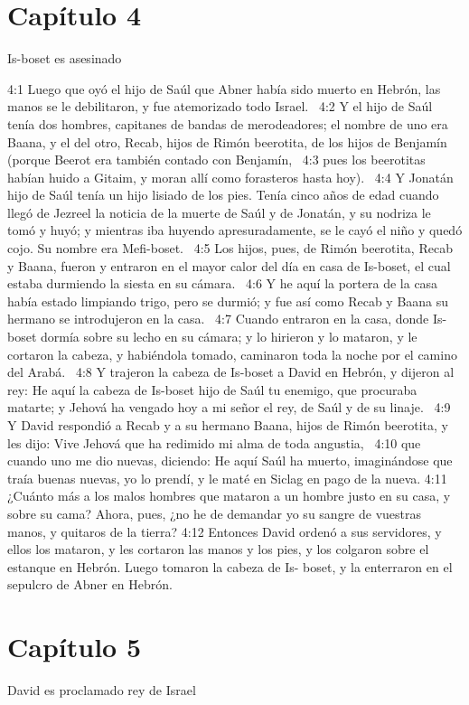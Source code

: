 \section*{Capítulo 4 }
Is-boset es asesinado  

4:1 Luego que oyó el hijo de Saúl que Abner había sido muerto en Hebrón, las manos se le debilitaron, y fue atemorizado todo Israel.  
4:2 Y el hijo de Saúl tenía dos hombres, capitanes de bandas de merodeadores; el nombre de uno era Baana, y el del otro, Recab, hijos de Rimón beerotita, de los hijos de Benjamín (porque Beerot era también contado con Benjamín,  
4:3 pues los beerotitas habían huido a Gitaim, y moran allí como forasteros hasta hoy).  
4:4 Y Jonatán hijo de Saúl tenía un hijo lisiado de los pies. Tenía cinco años de edad cuando llegó de Jezreel la noticia de la muerte de Saúl y de Jonatán, y su nodriza le tomó y huyó; y mientras iba huyendo apresuradamente, se le cayó el niño y quedó cojo. Su nombre era Mefi-boset.  
4:5 Los hijos, pues, de Rimón beerotita, Recab y Baana, fueron y entraron en el mayor calor del día en casa de Is-boset, el cual estaba durmiendo la siesta en su cámara.  
4:6 Y he aquí la portera de la casa había estado limpiando trigo, pero se durmió; y fue así como Recab y Baana su hermano se introdujeron en la casa.  
4:7 Cuando entraron en la casa, donde Is-boset dormía sobre su lecho en su cámara; y lo hirieron y lo mataron, y le cortaron la cabeza, y habiéndola tomado, caminaron toda la noche por el camino del Arabá.  
4:8 Y trajeron la cabeza de Is-boset a David en Hebrón, y dijeron al rey: He aquí la cabeza de Is-boset hijo de Saúl tu enemigo, que procuraba matarte; y Jehová ha vengado hoy a mi señor el rey, de Saúl y de su linaje.  
4:9 Y David respondió a Recab y a su hermano Baana, hijos de Rimón beerotita, y les dijo: Vive Jehová que ha redimido mi alma de toda angustia,  
4:10 que cuando uno me dio nuevas, diciendo: He aquí Saúl ha muerto, imaginándose que traía buenas nuevas, yo lo prendí, y le maté en Siclag en pago de la nueva. 
4:11 ¿Cuánto más a los malos hombres que mataron a un hombre justo en su casa, y sobre su cama? Ahora, pues, ¿no he de demandar yo su sangre de vuestras manos, y quitaros de la tierra? 
4:12 Entonces David ordenó a sus servidores, y ellos los mataron, y les cortaron las manos y los pies, y los colgaron sobre el estanque en Hebrón. Luego tomaron la cabeza de Is- boset, y la enterraron en el sepulcro de Abner en Hebrón.  
\section*{Capítulo 5}
David es proclamado rey de Israel  


